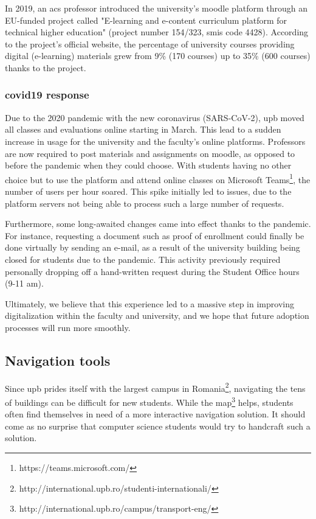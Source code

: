     In 2019, an \acrshort{acs} professor introduced the university's \gls{moodle} platform through an EU-funded project called "E-learning and e-content curriculum platform for technical higher education" (project number 154/323, \gls{smis} code 4428). According to the project's official website\cite{upb2009elearning}, the percentage of university courses providing digital (e-learning) materials grew from 9\% (170 courses) up to 35\% (600 courses) thanks to the project.
    
    \subsubsection{\gls{covid19} response} \label{2:existing_apps_history_covid}
    Due to the 2020 pandemic with the new coronavirus (SARS-CoV-2), \acrshort{upb} moved all classes and evaluations online starting in March. This lead to a sudden increase in usage for the university and the faculty's online platforms. Professors are now required to post materials and assignments on \gls{moodle}, as opposed to before the pandemic when they could choose. With students having no other choice but to use the platform and attend online classes on Microsoft Teams\footnote{https://teams.microsoft.com/}, the number of users per hour soared. This spike initially led to issues, due to the platform servers not being able to process such a large number of requests.
    
    Furthermore, some long-awaited changes came into effect thanks to the pandemic. For instance, requesting a document such as proof of enrollment could finally be done virtually by sending an e-mail, as a result of the university building being closed for students due to the pandemic. This activity previously required personally dropping off a hand-written request during the Student Office hours (9-11 am).
    
    Ultimately, we believe that this experience led to a massive step in improving digitalization within the faculty and university, and we hope that future adoption processes will run more smoothly.
    
    \subsection{Navigation tools} \label{2:existing_apps_navigation}
    Since \acrshort{upb} prides itself with the largest campus in Romania\footnote{http://international.upb.ro/studenti-internationali/}, navigating the tens of buildings can be difficult for new students. While the map\footnote{http://international.upb.ro/campus/transport-eng/} helps, students often find themselves in need of a more interactive navigation solution. It should come as no surprise that computer science students would try to handcraft such a solution.
    
